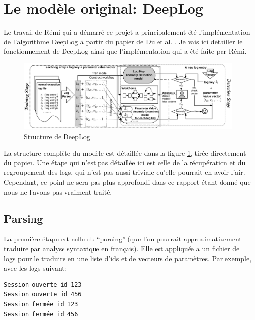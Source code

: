 \documentclass[openany, 12pt]{memoir}
\begin{document}

\section{Le modèle original: DeepLog}

Le travail de Rémi qui a démarré ce projet a principalement été l'implémentation de l'algorithme DeepLog à partir du papier de Du et al. \cite{deeplog}. Je vais ici détailler le fonctionnement de DeepLog ainsi que l'implémentation qui a été faite par Rémi.

\begin{figure}[ht]
	\centering
	\includegraphics[width=\textwidth]{images/deeplog.png}
	\caption{Structure de DeepLog}
	\label{deeplog}
\end{figure}

La structure complète du modèle est détaillée dans la figure \ref{deeplog}, tirée directement du papier. Une étape qui n'est pas détaillée ici est celle de la récupération et du regroupement des \glspl{log}, qui n'est pas aussi triviale qu'elle pourrait en avoir l'air. Cependant, ce point ne sera pas plus approfondi dans ce rapport étant donné que nous ne l'avons pas vraiment traité.

\subsection{Parsing}

La première étape est celle du ``parsing'' (que l'on pourrait approximativement traduire par analyse syntaxique en français). Elle est appliquée a un fichier de \glspl{log} pour le traduire en une liste d'ids et de vecteurs de paramètres. Par exemple, avec les \glspl{log} suivant:

\begin{lstlisting}
Session ouverte id 123
Session ouverte id 456
Session fermée id 123
Session fermée id 456
\end{lstlisting}
\end{document}
